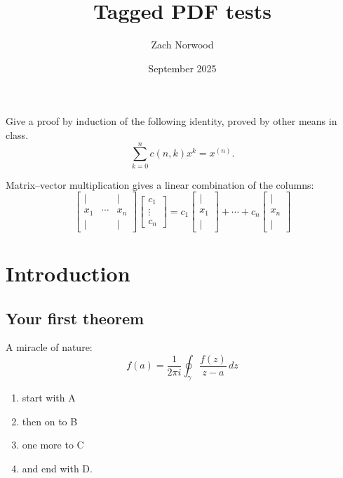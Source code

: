 \documentclass{article}
\title{Tagged PDF tests}
\author{Zach Norwood}
\date{September 2025}
\begin{document}
\maketitle

Give a proof by induction of the following identity, proved by other means in class.
\[
  \sum_{k=0}^n c(n,k) x^k = x^{(n)}.
\]

Matrix--vector multiplication gives a linear combination of the columns:
\[
\begin{bmatrix}
 \vert &        & \vert \\
 x_1   & \cdots & x_n   \\
 \vert &        & \vert
\end{bmatrix}
\begin{bmatrix}
 c_1 \\ \vdots \\ c_n
\end{bmatrix}
=
c_1 \begin{bmatrix} \vert \\ x_1 \\ \vert \end{bmatrix}
+ \cdots + c_n \begin{bmatrix} \vert \\ x_n \\ \vert \end{bmatrix}
\]

\section{Introduction}

\subsection{Your first theorem}

A miracle of nature:
\[
f(a) = \frac{1}{2\pi i} \oint_\gamma \frac{f(z)}{z-a}\,dz
\]

\begin{enumerate}[item-label=(\alph{*})]
\item start with A
\item then on to B
\item one more to C
\item and end with D.
\end{enumerate}
\end{document}
